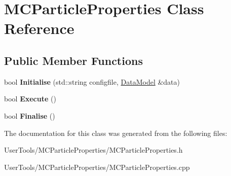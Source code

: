 \hypertarget{classMCParticleProperties}{
\section{MCParticleProperties Class Reference}
\label{classMCParticleProperties}
}
\subsection*{Public Member Functions}
\begin{DoxyCompactItemize}
\item 
\hypertarget{classMCParticleProperties_aeb42d506b628e71bad8d15c6d20b7728}{
bool {\bfseries Initialise} (std::string configfile, \hyperlink{classDataModel}{DataModel} \&data)}
\label{classMCParticleProperties_aeb42d506b628e71bad8d15c6d20b7728}

\item 
\hypertarget{classMCParticleProperties_a93cf4884b81b864d9a40ae53689ad9f8}{
bool {\bfseries Execute} ()}
\label{classMCParticleProperties_a93cf4884b81b864d9a40ae53689ad9f8}

\item 
\hypertarget{classMCParticleProperties_a6ed9e609a5194be6d1c2461759b086f1}{
bool {\bfseries Finalise} ()}
\label{classMCParticleProperties_a6ed9e609a5194be6d1c2461759b086f1}

\end{DoxyCompactItemize}


The documentation for this class was generated from the following files:\begin{DoxyCompactItemize}
\item 
UserTools/MCParticleProperties/MCParticleProperties.h\item 
UserTools/MCParticleProperties/MCParticleProperties.cpp\end{DoxyCompactItemize}
